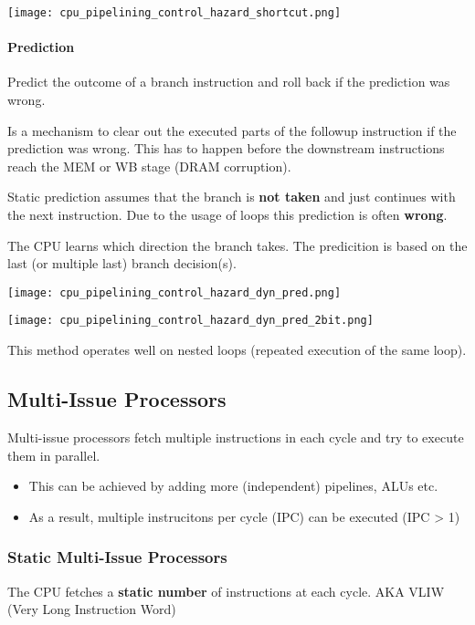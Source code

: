 \begin{multicols*}{3}
    \texttt{[image: cpu\_pipelining\_control\_hazard\_shortcut.png]}

    \paragraph{Prediction}\label{prediction}

    Predict the outcome of a branch instruction and roll back if the prediction was wrong.

    \newpar{}

    Is a mechanism to clear out the executed parts of the followup instruction if the prediction was wrong. This has to happen before the downstream instructions reach the MEM or WB stage (DRAM corruption).

    \newpar{}

    Static prediction assumes that the branch is \textbf{not taken} and just continues with the next instruction. Due to the usage of loops this prediction is often \textbf{wrong}.

    \newpar{}

    The CPU learns which direction the branch takes. The predicition is based on the last (or multiple last) branch decision(s). %

    \texttt{[image: cpu\_pipelining\_control\_hazard\_dyn\_pred.png]}

    \newpar{}

    \texttt{[image: cpu\_pipelining\_control\_hazard\_dyn\_pred\_2bit.png]}

    This method operates well on nested loops (repeated execution of the same loop).

    \subsection{Multi-Issue Processors}\label{multi-issue processors}
    Multi-issue processors fetch multiple instructions in each cycle and try to execute them in parallel.
    \begin{itemize}
        \item This can be achieved by adding more (independent) pipelines, ALUs etc.
        \item As a result, multiple instrucitons per cycle (IPC) can be executed (IPC > 1)
    \end{itemize}
    \subsubsection{Static Multi-Issue Processors}
    The CPU fetches a \textbf{static number} of instructions at each cycle. AKA VLIW (Very Long Instruction Word)


\end{multicols*}
